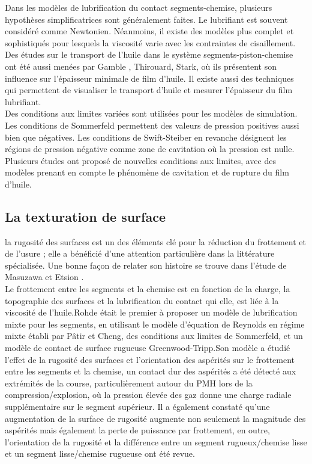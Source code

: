 Dans les modèles de lubrification du contact segments-chemise, plusieurs hypothèses simplificatrices sont généralement faites. Le lubrifiant est souvent considéré comme Newtonien. Néanmoins, il existe des modèles plus complet et sophistiqués pour lesquels la viscosité varie avec les contraintes de cisaillement\cite{tribo1}\cite{trobo2}. Des études sur le transport de l’huile dans le système segments-piston-chemise ont été aussi menées par Gamble , Thirouard, Stark, où ils présentent son influence sur l’épaisseur minimale de film d’huile. Il existe aussi des techniques qui permettent de visualiser le transport d’huile et mesurer l’épaisseur du film lubrifiant\cite{tribo1}.\\

Des conditions aux limites variées sont utilisées pour les modèles de simulation. Les conditions de Sommerfeld permettent des valeurs de pression positives aussi bien que négatives. Les conditions de Swift-Steiber en revanche désignent les régions de pression négative comme zone de cavitation où la pression est nulle. Plusieurs études ont proposé de nouvelles conditions aux limites, avec des modèles prenant en compte le phénomène de cavitation et de rupture du film d’huile\cite{trobo2}.

\subsection{La texturation de surface}
la rugosité des surfaces est un des éléments clé pour la réduction du frottement et de l’usure ; elle a bénéficié d’une attention particulière dans la littérature spécialisée. Une bonne façon de relater son histoire se trouve dans l’étude de Masuzawa et Etsion \cite{ayad2}. \\

Le frottement entre les segments et la chemise est en fonction de la charge, la topographie des surfaces et la lubrification du contact qui elle, est liée à la viscosité de l’huile.Rohde était le premier à proposer un modèle de lubrification mixte pour les segments, en utilisant le modèle d’équation de Reynolds en régime mixte établi par Pâtir et Cheng, des conditions aux limites de Sommerfeld, et un modèle de contact de surface rugueuse Greenwood-Tripp\cite{initiation}.Son modèle a étudié l’effet de la rugosité des surfaces et l'orientation des aspérités sur le frottement entre les segments et la chemise, un contact dur des aspérités a été détecté aux extrémités de la course, particulièrement autour du PMH lors de la compression/explosion, où la pression élevée des gaz donne une charge radiale supplémentaire sur le segment supérieur. Il a également constaté qu’une augmentation de la surface de rugosité augmente non seulement la magnitude des aspérités mais également la perte de puissance par frottement, en outre, l'orientation de la rugosité et la différence entre un segment rugueux/chemise lisse et un segment lisse/chemise rugueuse ont été revue.\cite{tribo1}\\

